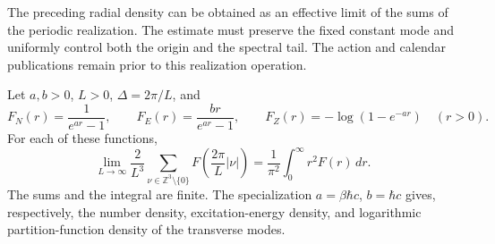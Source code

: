 The preceding radial density can be obtained as an effective limit of the
sums of the periodic realization. The estimate must preserve the fixed
constant mode and uniformly control both the origin and the spectral
tail. The action and calendar publications remain prior
to this realization operation.

\begin{lemma}
\label{v:v:lem:limite-termodinamico}
Let \(a,b>0\), \(L>0\), \(\Delta=2\pi/L\), and
\[
 F_N(r)=\frac{1}{e^{ar}-1},\qquad
 F_E(r)=\frac{br}{e^{ar}-1},\qquad
 F_Z(r)=-\log(1-e^{-ar})\quad(r>0).
\]
For each of these functions,
\begin{equation}
 \lim_{L\to\infty}\frac{2}{L^3}
 \sum_{\nu\in\mathbb Z^3\setminus\{0\}}
 F\!\left(\frac{2\pi}{L}|\nu|\right)
 =\frac{1}{\pi^2}\int_0^\infty r^2F(r)\,dr.
 \label{v:v:eq:limite-modos-discretos}
\end{equation}
The sums and the integral are finite. The specialization
\(a=\beta\hbar c\), \(b=\hbar c\) gives, respectively,
the number density, excitation-energy density, and logarithmic partition-function
density of the transverse modes.
\end{lemma}


